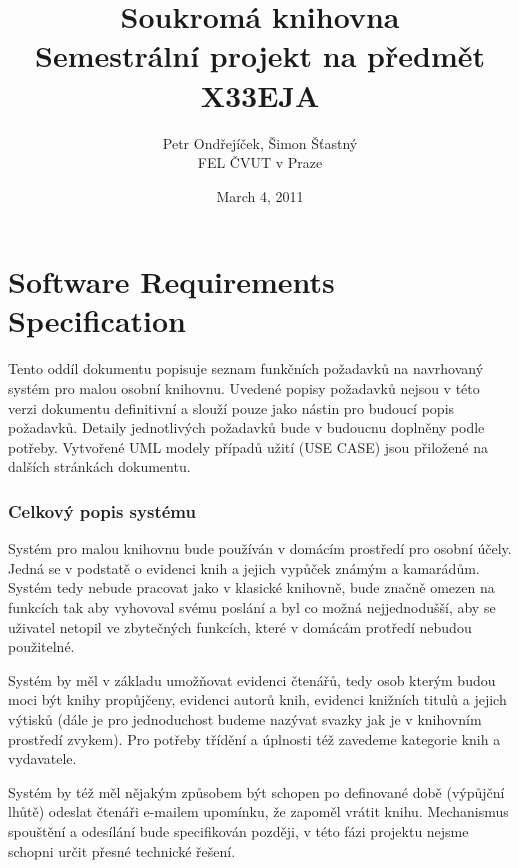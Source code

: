 \documentclass{article}
\title{Soukromá knihovna\\
 Semestrální projekt na předmět X33EJA}
\date{March 4, 2011}
\author{Petr Ondřejíček, Šimon Šťastný\\
FEL ČVUT v Praze}
\begin{document}
\begin{titlepage}
  \maketitle
  \thispagestyle{empty}
\end{titlepage}


\newpage

\part{Software Requirements Specification}

\vspace{10mm}
\smallskip

\indent \par Tento oddíl dokumentu popisuje seznam funkčních požadavků na
navrhovaný systém pro malou osobní knihovnu. Uvedené popisy požadavků nejsou v této verzi
dokumentu definitivní a slouží pouze jako nástin pro budoucí popis požadavků. Detaily jednotlivých požadavků
bude v budoucnu doplněny podle potřeby. Vytvořené UML modely případů užití (USE
CASE) jsou přiložené na dalších stránkách dokumentu.


\vspace{10mm}

\section{Celkový popis systému}
\indent \par Systém pro malou knihovnu bude používán v domácím prostředí pro
osobní účely. Jedná se v podstatě o evidenci knih a jejich vypůček známým a kamarádům. Systém
tedy nebude pracovat jako v klasické knihovně, bude značně omezen na funkcích
tak aby vyhovoval svému poslání a byl co možná nejjednodušší, aby se uživatel
netopil ve zbytečných funkcích, které v domácám protředí nebudou použitelné.

\bigskip

Systém by měl v základu umožňovat evidenci čtenářů, tedy osob kterým budou moci
být knihy propůjčeny, evidenci autorů knih, evidenci knižních titulů a jejich
výtisků (dále je pro jednoduchost budeme nazývat svazky jak je v knihovním
prostředí zvykem). Pro potřeby třídění a úplnosti též zavedeme kategorie knih a
vydavatele.

\bigskip

Systém by též měl nějakým způsobem být schopen po definované době (výpůjční
lhůtě) odeslat čtenáři e-mailem upomínku, že zapoměl vrátit knihu. Mechanismus
spouštění a odesílání bude specifikován později, v této fázi projektu nejsme
schopni určit přesné technické řešení.
\end{document}
